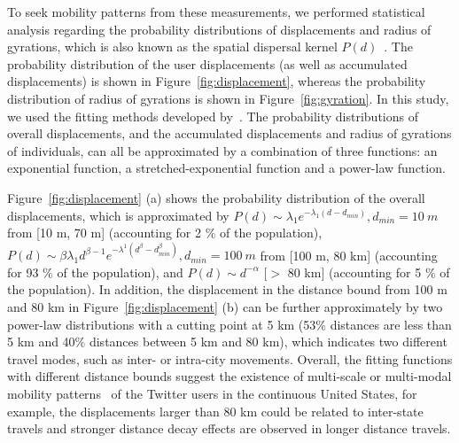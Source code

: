 \documentclass[ijgi,article,accept,moreauthors,pdftex,10pt,a4paper]{mdpi}
\theoremstyle{mdpi}
\newcounter{ex}
\newcounter{re}
\theoremstyle{mdpidefinition}
\begin{document}
To seek mobility patterns from these measurements, we performed statistical analysis regarding the probability distributions of displacements and radius of gyrations, which is also known as the spatial dispersal kernel $P(d)$~\cite{brockmann2006scaling}.
The probability distribution of the user displacements (as well as accumulated displacements) is shown in Figure~\ref{fig:displacement}, whereas the probability distribution of radius of gyrations is shown in Figure~\ref{fig:gyration}. 
In this study, we used the fitting methods developed by~\cite{Jurdak2015}.
The probability distributions of overall displacements, and the accumulated displacements and radius of gyrations of individuals, can all be approximated by a combination of three functions: an exponential function, a stretched-exponential function and a power-law function.

Figure~\ref{fig:displacement} (a) shows the probability distribution of the overall displacements, which is approximated by $P(d) \sim \lambda_{1} e^{-\lambda_{1}(d - d_{min})}, d_{min}=10~m$ from [10 m, 70 m] (accounting for 2 $\%$ of the population), $ P(d) \sim \beta\lambda_{1}d^{\beta-1}e^{-\lambda^{1}(d^\beta-d_{min}^\beta)}, d_{min}=100~m$ from [100 m, 80 km] (accounting for 93 $\%$ of the population), and $P(d) \sim {d}^{-\alpha}$ [$>$ 80 km] (accounting for 5 $\%$ of the population).
In addition, the displacement in the distance bound from 100 m and 80 km in Figure~\ref{fig:displacement} (b) can be further approximately by two power-law distributions with a cutting point at 5 km (53$\%$ distances are less than 5 km and 40$\%$ distances between 5 km and 80 km), which indicates two different travel modes, such as inter- or intra-city movements.
Overall, the fitting functions with different distance bounds suggest the existence of multi-scale or multi-modal mobility patterns~\cite{Jurdak2015} of the Twitter users in the continuous United States, for example, the displacements larger than 80 km could be related to inter-state travels and stronger distance decay effects are observed in longer distance travels. 
\end{document}
